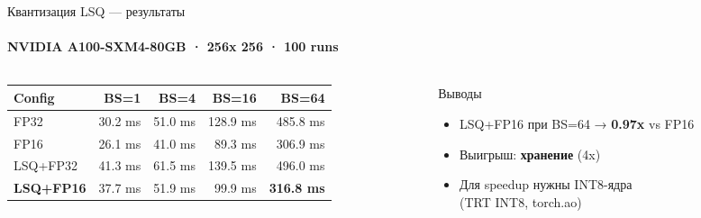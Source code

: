 \documentclass[aspectratio=169,11pt]{beamer}
\newcommand{\hlrow}{\rowcolor{hlgreen}}
\begin{document}
\begin{frame}[shrink=10]{Квантизация LSQ — результаты}
  \framesubtitle{NVIDIA A100-SXM4-80GB · 256x 256 · 100 runs}
  \begin{columns}[T]
    \begin{column}{0.54\textwidth}
      \small
      \renewcommand{\arraystretch}{1.22}
      \begin{tabular}{@{}lrrrr@{}}
        \toprule
        \textbf{Config} & \textbf{BS=1} & \textbf{BS=4} & \textbf{BS=16} & \textbf{BS=64} \\
        \midrule
        FP32      & 30.2 ms & 51.0 ms & 128.9 ms & 485.8 ms \\
        FP16      & 26.1 ms & 41.0 ms &  89.3 ms & 306.9 ms \\
        LSQ+FP32  & 41.3 ms & 61.5 ms & 139.5 ms & 496.0 ms \\
        \hlrow
        \textbf{LSQ+FP16} & 37.7 ms & 51.9 ms & 99.9 ms & \textbf{316.8 ms} \\
        \bottomrule
      \end{tabular}
      \vspace{0.4em}
      \footnotesize
    \end{column}
    \begin{column}{0.42\textwidth}
      \begin{block}{Выводы}
        \begin{itemize}
          \item LSQ+FP16 при BS=64 → \textbf{0.97x} vs FP16
          \item Выигрыш: \textbf{хранение} (4x)
          \item Для speedup нужны INT8-ядра\\
                \footnotesize{(TRT INT8, torch.ao)}
        \end{itemize}
      \end{block}
    \end{column}
  \end{columns}
\end{frame}
\end{document}
